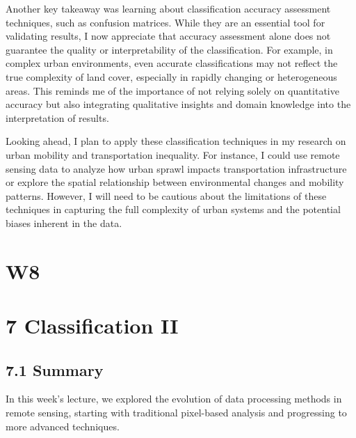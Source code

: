 \documentclass[
  letterpaper,
  DIV=11,
  numbers=noendperiod]{scrreprt}
\begin{document}
Another key takeaway was learning about classification accuracy
assessment techniques, such as confusion matrices. While they are an
essential tool for validating results, I now appreciate that accuracy
assessment alone does not guarantee the quality or interpretability of
the classification. For example, in complex urban environments, even
accurate classifications may not reflect the true complexity of land
cover, especially in rapidly changing or heterogeneous areas. This
reminds me of the importance of not relying solely on quantitative
accuracy but also integrating qualitative insights and domain knowledge
into the interpretation of results.

Looking ahead, I plan to apply these classification techniques in my
research on urban mobility and transportation inequality. For instance,
I could use remote sensing data to analyze how urban sprawl impacts
transportation infrastructure or explore the spatial relationship
between environmental changes and mobility patterns. However, I will
need to be cautious about the limitations of these techniques in
capturing the full complexity of urban systems and the potential biases
inherent in the data.


\chapter{W8}\label{w8}


\chapter{7 Classification II}\label{classification-ii}

\section{7.1 Summary}\label{summary-5}

In this week's lecture, we explored the evolution of data processing
methods in remote sensing, starting with traditional pixel-based
analysis and progressing to more advanced techniques.
\end{document}
